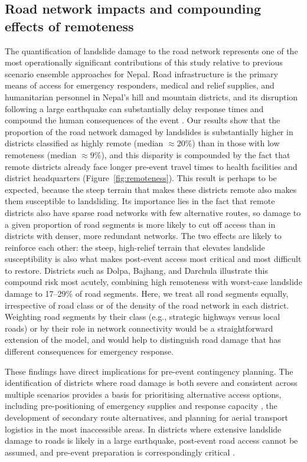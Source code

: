\documentclass[preprint,12pt,authoryear]{elsarticle}
\begin{document}
\subsection{Road network impacts and compounding effects of remoteness}

The quantification of landslide damage to the road network represents one of the most operationally significant contributions of this study relative to previous scenario ensemble approaches for Nepal. Road infrastructure is the primary means of access for emergency responders, medical and relief supplies, and humanitarian personnel in Nepal's hill and mountain districts, and its disruption following a large earthquake can substantially delay response times and compound the human consequences of the event \citep{Koks2019, NationalPlanningCommission2015}. Our results show that the proportion of the road network damaged by landslides is substantially higher in districts classified as highly remote (median $\approx 20\%$) than in those with low remoteness (median $\approx 9\%$), and this disparity is compounded by the fact that remote districts already face longer pre-event travel times to health facilities and district headquarters (Figure~\ref{fig:remoteness}). This result is perhaps to be expected, because the steep terrain that makes these districts remote also makes them susceptible to landsliding. Its importance lies in the fact that remote districts also have sparse road networks with few alternative routes, so damage to a given proportion of road segments is more likely to cut off access than in districts with denser, more redundant networks. The two effects are likely to reinforce each other: the steep, high-relief terrain that elevates landslide susceptibility is also what makes post-event access most critical and most difficult to restore. Districts such as Dolpa, Bajhang, and Darchula illustrate this compound risk most acutely, combining high remoteness with worst-case landslide damage to 17--29\% of road segments. Here, we treat all road segments equally, irrespective of road class or of the density of the road network in each district. Weighting road segments by their class (e.g., strategic highways versus local roads) or by their role in network connectivity would be a straightforward extension of the model, and would help to distinguish road damage that has different consequences for emergency response.

These findings have direct implications for pre-event contingency planning. The identification of districts where road damage is both severe and consistent across multiple scenarios provides a basis for prioritising alternative access options, including pre-positioning of emergency supplies and response capacity \citep{Sijapati2024}, the development of secondary route alternatives, and planning for aerial transport logistics in the most inaccessible areas. In districts where extensive landslide damage to roads is likely in a large earthquake, post-event road access cannot be assumed, and pre-event preparation is correspondingly critical \citep{IASC2007}.
\end{document}

